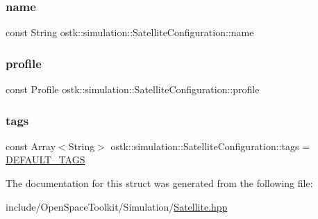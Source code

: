 \subsubsection{\texorpdfstring{name}{name}}
{\footnotesize\ttfamily const String ostk\+::simulation\+::\+Satellite\+Configuration\+::name}

\mbox{\label{structostk_1_1simulation_1_1_satellite_configuration_ab2afb3f9823e69021f909495fb74ca3f}} 
\subsubsection{\texorpdfstring{profile}{profile}}
{\footnotesize\ttfamily const Profile ostk\+::simulation\+::\+Satellite\+Configuration\+::profile}

\mbox{\label{structostk_1_1simulation_1_1_satellite_configuration_a6db145a39cbb82053013b7ee92dcc326}} 
\subsubsection{\texorpdfstring{tags}{tags}}
{\footnotesize\ttfamily const Array$<$String$>$ ostk\+::simulation\+::\+Satellite\+Configuration\+::tags = \hyperlink{_satellite_8hpp_a7cabb8538f234177d4f95e681045bf94}{D\+E\+F\+A\+U\+L\+T\+\_\+\+T\+A\+GS}}



The documentation for this struct was generated from the following file\+:\begin{DoxyCompactItemize}
\item 
include/\+Open\+Space\+Toolkit/\+Simulation/\hyperlink{_satellite_8hpp}{Satellite.\+hpp}\end{DoxyCompactItemize}
